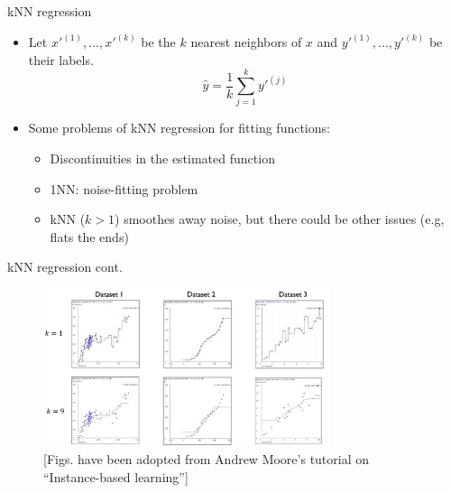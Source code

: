 \documentclass[serif, aspectratio=169]{beamer}
\begin{document}
\begin{frame}{kNN regression}
    \begin{itemize}
        \item Let $x'^{(1)}, \dots , x'^{(k)}$ be the $k$ nearest neighbors of $x$ and $y'^{(1)}, \dots, y'^{(k)}$ be their labels.
        \[
            \hat{y} = \frac{1}{k}\sum _{j=1}^k y'^{(j)}
        \]
        \item Some problems of kNN regression for fitting functions:
        \begin{itemize}
            \item Discontinuities in the estimated function
            \item 1NN: noise-fitting problem
            \item kNN ($k>1$) smoothes away noise, but there could be other issues (e.g, flats the ends)
        \end{itemize}
    \end{itemize}
\end{frame}
\begin{frame}{kNN regression cont.}
    \begin{figure}[h]
            \centering
            
            \includegraphics[width=0.75\textwidth]{pic/knnR1.png}
            \caption* { \scriptsize [Figs. have been adopted from Andrew Moore’s tutorial on “Instance-based learning”]}
            \end{figure}
\end{frame}
\end{document}
